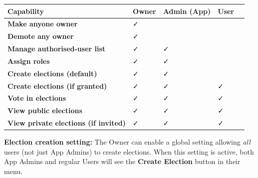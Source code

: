 \documentclass[12pt,a4paper,openany]{book}
\newcommand{\uimenu}[1]{\textbf{\color{primaryblue}#1}}
\begin{document}
\begin{center}
	\begin{tabularx}{0.95\textwidth}{>{\bfseries}l XXXX}
		\toprule
		\rowcolor{primaryblue}\color{white}Capability           & \color{white}Owner                  & \color{white}Admin (App)            & \color{white}User                   \\
		\midrule
		\rowcolor{lightgray}Make anyone owner                   & \textcolor{successborder}{\faCheck} & \textcolor{dangerborder}{\faTimes}  & \textcolor{dangerborder}{\faTimes}  \\
		Demote any owner                                        & \textcolor{successborder}{\faCheck} & \textcolor{dangerborder}{\faTimes}  & \textcolor{dangerborder}{\faTimes}  \\
		\rowcolor{lightgray}Manage authorised-user list         & \textcolor{successborder}{\faCheck} & \textcolor{successborder}{\faCheck} & \textcolor{dangerborder}{\faTimes}  \\
		Assign roles                                            & \textcolor{successborder}{\faCheck} & \textcolor{successborder}{\faCheck} & \textcolor{dangerborder}{\faTimes}  \\
		\rowcolor{lightgray}Create elections (default)          & \textcolor{successborder}{\faCheck} & \textcolor{successborder}{\faCheck} & \textcolor{dangerborder}{\faTimes}  \\
		Create elections (if granted)                           & \textcolor{successborder}{\faCheck} & \textcolor{successborder}{\faCheck} & \textcolor{successborder}{\faCheck} \\
		\rowcolor{lightgray}Vote in elections                   & \textcolor{successborder}{\faCheck} & \textcolor{successborder}{\faCheck} & \textcolor{successborder}{\faCheck} \\
		View public elections                                   & \textcolor{successborder}{\faCheck} & \textcolor{successborder}{\faCheck} & \textcolor{successborder}{\faCheck} \\
		\rowcolor{lightgray}View private elections (if invited) & \textcolor{successborder}{\faCheck} & \textcolor{successborder}{\faCheck} & \textcolor{successborder}{\faCheck} \\
		\bottomrule
	\end{tabularx}
\end{center}

\begin{tcolorbox}[notebox]
	\textbf{Election creation setting:} The Owner can enable a global setting allowing \emph{all} users (not just App Admins) to create elections. When this setting is active, both App Admins and regular Users will see the \uimenu{Create Election} button in their menu.
\end{tcolorbox}
\end{document}
